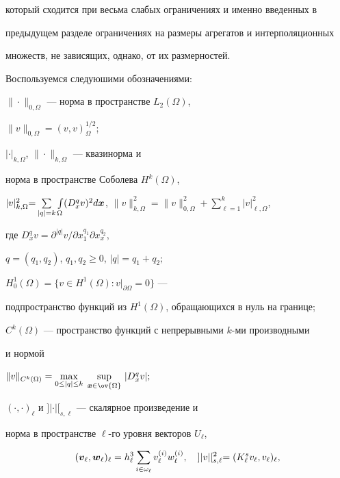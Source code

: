 который сходится при весьма слабых ограничениях и именно введенных в


предыдущем разделе ограничениях на размеры агрегатов и интерполяционных


множеств, не зависящих, однако, от их размерностей.





Воспользуемся следуюшими обозначениями:





$\|\cdot\|_{0,\Omega}$ --- норма в пространстве $L_2(\Omega)$,


$\|v\|_{0,\Omega}=(v,v)^{1/2}_\Omega$;





$|\cdot|_{k,\Omega}$, $\|\cdot\|_{k,\Omega}$ --- квазинорма и


норма в пространстве Соболева $H^k(\Omega)$,


$|v|^2_{k,\Omega}{=}\sum\limits_{|q|=k}\int\limits_\Omega


(D^q_xv)^2d{\bi x}$, $\|v\|^2_{k,\Omega}=\|v\|^2_{0,\Omega}+


\sum\limits^k_{\ell=1}|v|^2_{\ell,\Omega}$,


где $D^q_x v=\partial^{|q|} v/\partial x_1^{q_1}\partial x^{q_2}_x$,


$q=(q_1,q_2)$, $q_1,q_2\ge 0$, $|q|=q_1+q_2;$





$H_0^1(\Omega)=\{v\in H^1(\Omega): v\big|_{\partial\Omega}=0\}$ ---


подпространство функций из $H^1(\Omega)$, обращающихся в нуль на границе;





$C^k(\Omega)$ --- пространство функций с непрерывными $k$-ми производными


и нормой


$\|v\|_{C^k(\Omega)}=\max\limits_{0\le|q|\le k}\;


\sup\limits_{{\bi x}\in\ov{\Omega}}\,|D^q_x v|;$





$(\cdot,\cdot)_\ell$ и $]|\cdot|[_{s,\ell}$ --- скалярное произведение и


норма в пространстве $\ell$-го уровня векторов $U_\ell$,


\begin{equation}\label{4.1}


({\bi v}_\ell, {\bi w}_\ell)_\ell=


h^3_\ell \sum_{i\in\omega_\ell} v_\ell\up i


w\up i_\ell,\quad ]|v|[^2_{s,\ell}=(K^s_\ell v_\ell, v_\ell)_\ell,


\end{equation}


